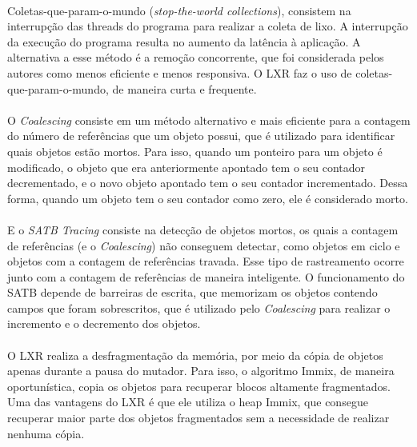 \documentclass[12pt]{article}
\begin{document}
\paragraph{}Coletas-que-param-o-mundo (\textit{stop-the-world collections}), consistem na interrupção das threads do programa para realizar a coleta de lixo. A interrupção da execução do programa resulta no aumento da latência à aplicação. A alternativa a esse método é a remoção concorrente, que foi considerada pelos autores como menos eficiente e menos responsiva. O LXR faz o uso de coletas-que-param-o-mundo, de maneira curta e frequente.

\paragraph{}O \textit{Coalescing} consiste em um método alternativo e mais eficiente para a contagem do número de referências que um objeto possui, que é utilizado para identificar quais objetos estão mortos. Para isso, quando um ponteiro para um objeto é modificado, o objeto que era anteriormente apontado tem o seu contador decrementado, e o novo objeto apontado tem o seu contador incrementado. Dessa forma, quando um objeto tem o seu contador como zero, ele é considerado morto.

\paragraph{}E o \textit{SATB Tracing} consiste na detecção de objetos mortos, os quais a contagem de referências (e o \textit{Coalescing}) não conseguem detectar, como objetos em ciclo e objetos com a contagem de referências travada. Esse tipo de rastreamento ocorre junto com a contagem de referências de maneira inteligente. O funcionamento do SATB depende de barreiras de escrita, que memorizam os objetos contendo campos que foram sobrescritos, que é utilizado pelo \textit{Coalescing} para realizar o incremento e o decremento dos objetos.

\paragraph{}O LXR realiza a desfragmentação da memória, por meio da cópia de objetos apenas durante a pausa do mutador. Para isso, o algoritmo Immix, de maneira oportunística, copia os objetos para recuperar blocos altamente fragmentados. Uma das vantagens do LXR é que ele utiliza o heap Immix, que consegue recuperar maior parte dos objetos fragmentados sem a necessidade de realizar nenhuma cópia.
\end{document}
